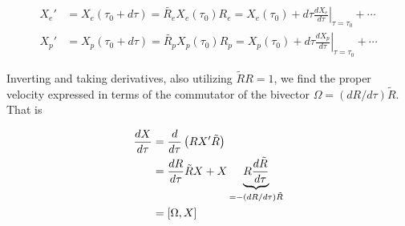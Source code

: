\begin{align*}
X_e' &= X_e(\tau_0 + d\tau) = \tilde{R_e} X_e(\tau_0) R_e = X_e(\tau_0) + d\tau {\left. \frac{dX_e}{d\tau} \right\vert}_{\tau = \tau_0} + \cdots \\
X_p' &= X_p(\tau_0 + d\tau) = \tilde{R_p} X_p(\tau_0) R_p = X_p(\tau_0) + d\tau {\left. \frac{dX_p}{d\tau} \right\vert}_{\tau = \tau_0} + \cdots
\end{align*}

%
Inverting and taking derivatives, also utilizing $\tilde{R}{R} = 1$, we find the proper velocity expressed in terms of the commutator of the bivector $\Omega = (dR/d\tau) \tilde{R}$.   That is

\begin{align*}
\frac{dX}{d\tau} 
&= \frac{d}{d\tau} \left( R X' \tilde{R} \right) \\
&= \frac{dR }{d\tau} \tilde{R} X + X \underbrace{R \frac{d\tilde{R}}{d\tau}}_{= - (dR/d\tau) \tilde{R}} \\
&= \left[{ \Omega },{X}\right]
\end{align*}



\EndArticle
